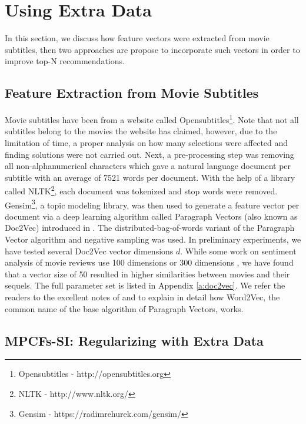  

\section{Using Extra Data}
\label{st:using-extra-data}
In this section, we discuss how feature vectors were extracted from movie subtitles, then two approaches are propose to incorporate such vectors in order to improve top-N recommendations.

\subsection{Feature Extraction from Movie Subtitles}
\label{sst:feature-extraction}
Movie subtitles have been from a website called Opensubtitles\footnote{Opensubtitles - http://opensubtitles.org}.
Note that not all subtitles belong to the movies the website has claimed, however, due to the limitation of time, a proper analysis on how many selections were affected and finding solutions were not carried out.
Next, a pre-processing step was removing all non-alphanumerical characters which gave a natural language document per subtitle with an average of 7521 words per document.
With the help of a library called NLTK\footnote{\label{fn:nltk}NLTK - http://www.nltk.org/}, each document was tokenized and stop words were removed.
Gensim\footnote{Gensim - https://radimrehurek.com/gensim/}, a topic modeling library, was then used to generate a feature vector per document via a deep learning algorithm called Paragraph Vectors (also known as Doc2Vec) introduced in \cite{Le2014a}.
The distributed-bag-of-words variant of the Paragraph Vector algorithm and negative sampling was used.
In preliminary experiments, we have tested several Doc2Vec vector dimensions $d$.
While some work on sentiment analysis of movie reviews use 100 dimensions \cite{Qiu2015} or 300 dimensions \cite{Chapman2014}, we have found that a vector size of 50 resulted in higher similarities between movies and their sequels.
The full parameter set is listed in Appendix \ref{a:doc2vec}.
We refer the readers to the excellent notes of \cite{Rong} and \cite{Goldberg2014} to explain in detail how Word2Vec, the common name of the base algorithm of Paragraph Vectors, works.

\subsection{MPCFs-SI: Regularizing with Extra Data}
\label{sst:mpcfs-si}

